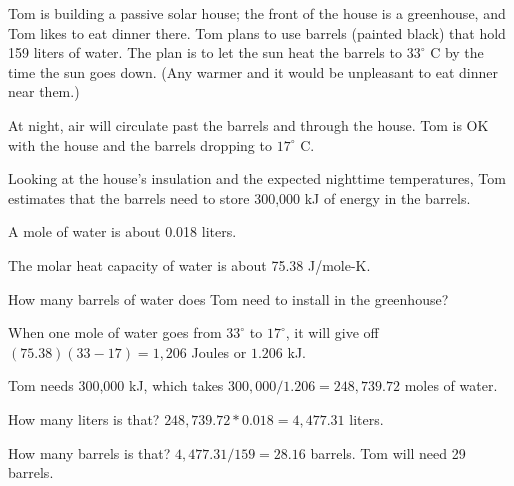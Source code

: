\begin{Exercise}[title={Using Water For Thermal Energy Storage}, label=waterthermal]
Tom is building a passive solar house; the front of the house is a greenhouse, and Tom likes to 
eat dinner there. Tom plans to use barrels (painted black) that hold 159 liters of water. The plan is to let the sun heat the barrels to $33^\circ$ C by the time the sun goes down. (Any warmer and it would be unpleasant to eat dinner near them.)

At night, air will circulate past the barrels and through the house. Tom is OK with the house and the barrels dropping to $17^\circ$ C.

Looking at the house's insulation and the expected nighttime temperatures, Tom estimates that the barrels need to store 300,000 kJ of energy in the barrels.

A mole of water is about 0.018 liters.

The molar heat capacity of water is about 75.38 J/mole-K.

How many barrels of water does Tom need to install in the greenhouse?

\end{Exercise}
\begin{Answer}[ref=waterthermal] 

When one mole of water goes from $33^\circ$ to $17^\circ$, it will give off $(75.38)(33-17) = 1,206$ Joules or $1.206$ kJ. 

Tom needs 300,000 kJ, which takes $300,000/1.206 =  248,739.72$ moles of water.

How many liters is that? $248,739.72 * 0.018 = 4,477.31$ liters.

How many barrels is that? $4,477.31 / 159 = 28.16$ barrels. Tom will need 29 barrels.
 
\end{Answer}


